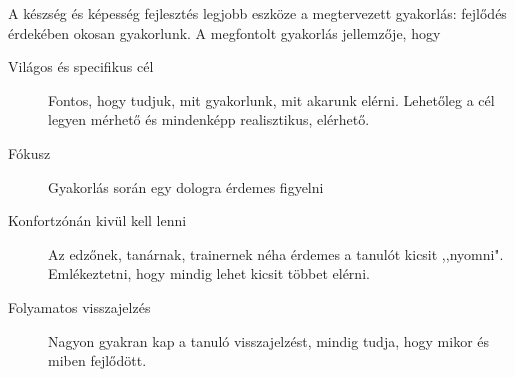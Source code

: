 A készség és képesség fejlesztés legjobb eszköze a megtervezett
gyakorlás: fejlődés érdekében okosan gyakorlunk. A megfontolt gyakorlás
jellemzője, hogy

\begin{description}
\item[Világos és specifikus cél]
Fontos, hogy tudjuk, mit gyakorlunk, mit akarunk elérni. Lehetőleg a cél
legyen mérhető és mindenképp realisztikus, elérhető.
\item[Fókusz]
Gyakorlás során egy dologra érdemes figyelni
\item[Konfortzónán kivül kell lenni]
Az edzőnek, tanárnak, trainernek néha érdemes a tanulót kicsit
,,nyomni". Emlékeztetni, hogy mindig lehet kicsit többet elérni.
\item[Folyamatos visszajelzés]
Nagyon gyakran kap a tanuló visszajelzést, mindig tudja, hogy mikor és
miben fejlődött.
\end{description}
